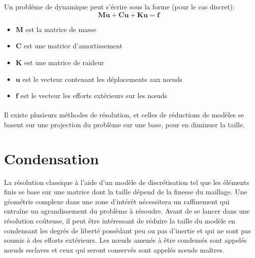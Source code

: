 \documentclass[12pt,a4paper]{report}
\begin{document}
\noindent
Un problème de dynamique peut s'écrire sous la forme (pour le cas discret):
\begin{equation}
\label{PFD}
\mathbf{M}\mathbf{\ddot{u}} + \mathbf{C}\mathbf{\dot{u}} + \mathbf{K}\mathbf{u} =
\mathbf{f}
\end{equation}
\begin{itemize}
\item $\mathbf{M}$ est la matrice de masse
\item $\mathbf{C}$ est une matrice d'amortissement
\item $\mathbf{K}$ est une matrice de raideur
\item $\mathbf{u}$ est le vecteur contenant les déplacements aux nœuds
\item $\mathbf{f}$ est le vecteur les efforts extérieurs sur les nœuds
\end{itemize}

\paragraph{}
Il existe plusieurs méthodes de résolution, et celles de réductions de modèles se basent sur une projection du problème sur une base, pour en diminuer la taille.

\section{Condensation\label{SectionCondensation}}
La résolution classique à l'aide d'un modèle de discrétisation tel que les éléments finis se base sur une matrice dont la taille dépend de la finesse du maillage. Une géométrie complexe dans une zone d'intérêt nécessitera un raffinement qui entraîne un agrandissement du problème à résoudre. Avant de se lancer dans une résolution coûteuse, il peut être intéressant de réduire la taille du modèle en condensant les degrés de liberté possédant peu ou pas d'inertie et qui ne sont pas soumis à des efforts extérieurs. Les nœuds  amenés à être condensés sont appelés nœuds esclaves et ceux qui seront conservés sont appelés nœuds maîtres.
\end{document}
